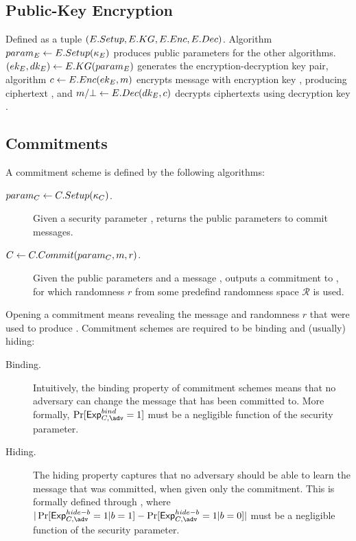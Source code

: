 \subsection{Public-Key Encryption}
\label{sapp:pk-encryption}

Defined as a tuple $(E.Setup,E.KG,E.Enc,E.Dec)$. Algorithm $param_{E} \gets
E.Setup(\kappa_{E})$ produces public parameters for the other algorithms.
$(ek_{E},dk_{E}) \gets E.KG(param_{E})$ generates the encryption-decryption key
pair, algorithm $c \gets E.Enc(ek_{E},m)$ encrypts message \msg with
encryption key \Eek, producing ciphertext \Ec, and $m/\bot \gets E.Dec(dk_{E},
c)$ decrypts ciphertexts using decryption key \Edk. 

\subsection{Commitments}
\label{sapp:commitments}

A commitment scheme is defined by the following algorithms:

\begin{description}
\item[$param_C \gets C.Setup(\kappa_{C})$.] Given a security parameter \Csecpar,
  returns the public parameters \Cparm to commit messages.
\item[$C \gets C.Commit(param_C,m,r)$.] Given the public parameters and
  a message \msg, outputs a commitment \Ccom to \msg, for which randomness $r$
  from some predefind randomness space $\mathcal{R}$ is used.
\end{description}

Opening a commitment \Ccom means revealing the message \msg and randomness $r$
that were used to produce \Ccom. Commitment schemes are required to be binding
and (usually) hiding:

\begin{description}
\item[Binding.] Intuitively, the binding property of commitment schemes means
  that no adversary can change the message that has been committed to. More
  formally, $\Pr[\ExpComBind = 1]$ must be a negligible function of the security
  parameter.
\item[Hiding.] The hiding property captures that no adversary should be able to
  learn the message that was committed, when given only the commitment. This is
  formally defined through \ExpComHideb, where $|\Pr[\ExpComHideb=1|b=1] -
  \Pr[\ExpComHideb=1|b=0]|$ must be a negligible function of the security
  parameter.
\end{description}

